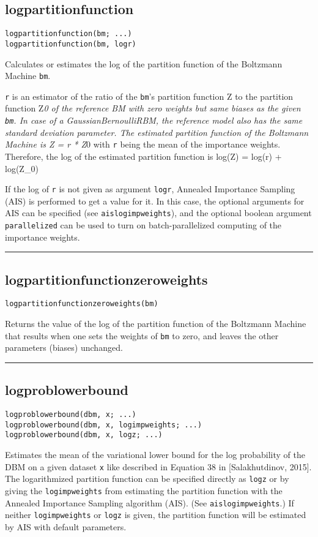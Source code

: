 \subsection*{logpartitionfunction}
\begin{verbatim}
logpartitionfunction(bm; ...)
logpartitionfunction(bm, logr)
\end{verbatim}
Calculates or estimates the log of the partition function of the Boltzmann Machine \texttt{bm}.

\texttt{r} is an estimator of the ratio of the \texttt{bm}'s partition function Z to the partition function Z\emph{0 of the reference BM with zero weights but same biases as the given \texttt{bm}. In case of a GaussianBernoulliRBM, the reference model also has the same standard deviation parameter. The estimated partition function of the Boltzmann Machine is Z = r * Z}0 with \texttt{r} being the mean of the importance weights. Therefore, the log of the estimated partition function is log(Z) = log(r) + log(Z\_0)

If the log of \texttt{r} is not given as argument \texttt{logr}, Annealed Importance Sampling (AIS) is performed to get a value for it. In this case, the optional arguments for AIS can be specified (see \texttt{aislogimpweights}), and the optional boolean argument \texttt{parallelized} can be used to turn on batch-parallelized computing of the importance weights.

\noindent\rule{\textwidth}{1pt}
\subsection*{logpartitionfunctionzeroweights}
\begin{verbatim}
logpartitionfunctionzeroweights(bm)
\end{verbatim}
Returns the value of the log of the partition function of the Boltzmann Machine that results when one sets the weights of \texttt{bm} to zero, and leaves the other parameters (biases) unchanged.

\noindent\rule{\textwidth}{1pt}
\subsection*{logproblowerbound}
\begin{verbatim}
logproblowerbound(dbm, x; ...)
logproblowerbound(dbm, x, logimpweights; ...)
logproblowerbound(dbm, x, logz; ...)
\end{verbatim}
Estimates the mean of the variational lower bound for the log probability of the DBM on a given dataset \texttt{x} like described in Equation 38 in [Salakhutdinov, 2015]. The logarithmized partition function can be specified directly as \texttt{logz} or by giving the \texttt{logimpweights} from estimating the partition function with the Annealed Importance Sampling algorithm (AIS). (See \texttt{aislogimpweights}.) If neither \texttt{logimpweights} or \texttt{logz} is given, the partition function will be estimated by AIS with default parameters.

